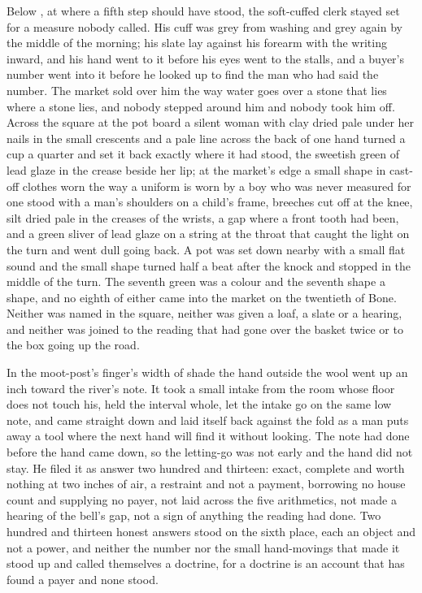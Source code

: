 Below , at  where a fifth step should have stood, the soft-cuffed clerk stayed set for a measure nobody called. His cuff was grey from washing and grey again by the middle of the morning; his slate lay against his forearm with the writing inward, and his hand went to it before his eyes went to the stalls, and a buyer's number went into it before he looked up to find the man who had said the number. The market sold over him the way water goes over a stone that lies where a stone lies, and nobody stepped around him and nobody took him off. Across the square at the pot board a silent woman with clay dried pale under her nails in the small crescents and a pale line across the back of one hand turned a cup a quarter and set it back exactly where it had stood, the sweetish green of lead glaze in the crease beside her lip; at the market's edge a small shape in cast-off clothes worn the way a uniform is worn by a boy who was never measured for one stood with a man's shoulders on a child's frame, breeches cut off at the knee, silt dried pale in the creases of the wrists, a gap where a front tooth had been, and a green sliver of lead glaze on a string at the throat that caught the light on the turn and went dull going back. A pot was set down nearby with a small flat sound and the small shape turned half a beat after the knock and stopped in the middle of the turn. The seventh green was a colour and the seventh shape a shape, and no eighth of either came into the market on the twentieth of Bone. Neither was named in the square, neither was given a loaf, a slate or a hearing, and neither was joined to the reading that had gone over the basket twice or to the box going up the road.

\scenebreak

In the moot-post's finger's width of shade the hand outside the wool went up an inch toward the river's note. It took a small intake from the room whose floor does not touch his, held the interval whole, let the intake go on the same low note, and came straight down and laid itself back against the fold as a man puts away a tool where the next hand will find it without looking. The note had done before the hand came down, so the letting-go was not early and the hand did not stay. He filed it as answer two hundred and thirteen: exact, complete and worth nothing at two inches of air, a restraint and not a payment, borrowing no house count and supplying no payer, not laid across the five arithmetics, not made a hearing of the bell's gap, not a sign of anything the reading had done. Two hundred and thirteen honest answers stood on the sixth place, each an object and not a power, and neither the number nor the small hand-movings that made it stood up and called themselves a doctrine, for a doctrine is an account that has found a payer and none stood.

